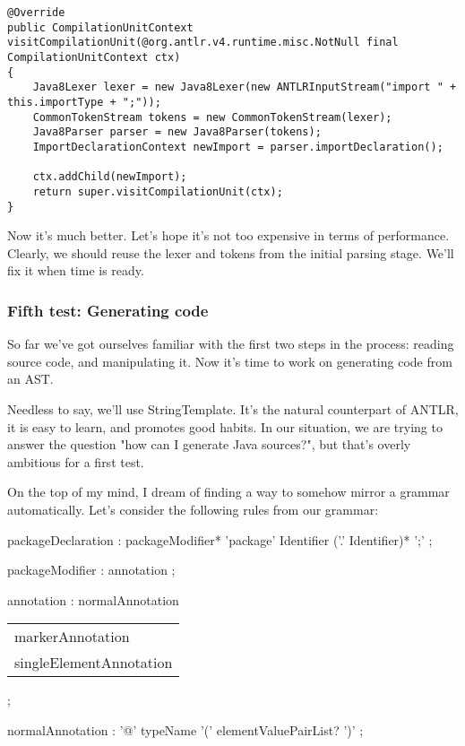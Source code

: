 \documentclass[11pt]{article}
\begin{document}
\begin{verbatim}
@Override
public CompilationUnitContext visitCompilationUnit(@org.antlr.v4.runtime.misc.NotNull final CompilationUnitContext ctx)
{
    Java8Lexer lexer = new Java8Lexer(new ANTLRInputStream("import " + this.importType + ";"));
    CommonTokenStream tokens = new CommonTokenStream(lexer);
    Java8Parser parser = new Java8Parser(tokens);
    ImportDeclarationContext newImport = parser.importDeclaration();

    ctx.addChild(newImport);
    return super.visitCompilationUnit(ctx);
}
\end{verbatim}

Now it's much better. Let's hope it's not too expensive in terms of performance. Clearly, we should reuse the lexer and tokens from the initial parsing stage. We'll fix it
when time is ready.

\subsubsection{Fifth test: Generating code}
\label{sec-1-3-5}

So far we've got ourselves familiar with the first two steps in the process: reading source code, and manipulating it. Now it's time to
work on generating code from an AST.

Needless to say, we'll use StringTemplate. It's the natural counterpart of ANTLR, it is easy to learn, and promotes good habits.
In our situation, we are trying to answer the question "how can I generate Java sources?", but that's overly ambitious for a
first test.

On the top of my mind, I dream of finding a way to somehow mirror a grammar automatically. Let's consider the following rules from our grammar:

packageDeclaration
:        packageModifier* 'package' Identifier ('.' Identifier)* ';'
;

packageModifier
:        annotation
;

annotation
:        normalAnnotation
\begin{center}
\begin{tabular}{l}
markerAnnotation\\
singleElementAnnotation\\
\end{tabular}
\end{center}
;

normalAnnotation
:        '@' typeName '(' elementValuePairList? ')'
;
\end{document}

